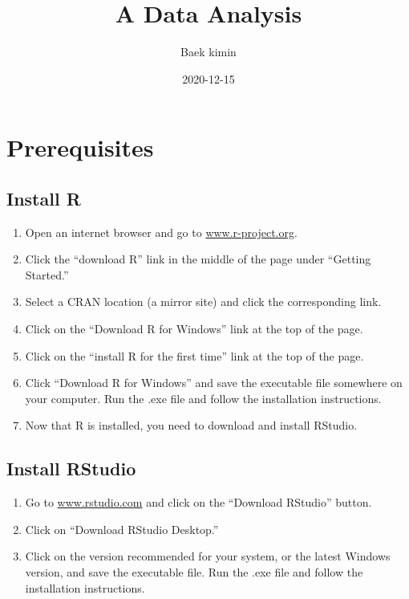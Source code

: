 \documentclass[
]{book}
\title{A Data Analysis}
\author{Baek kimin}
\date{2020-12-15}
\providecommand{\tightlist}{%
  \setlength{\itemsep}{0pt}\setlength{\parskip}{0pt}}
\begin{document}
\maketitle

{
\setcounter{tocdepth}{1}
\tableofcontents
}
\hypertarget{prerequisites}{%
\chapter*{Prerequisites}\label{prerequisites}}

\hypertarget{install-r}{%
\section*{Install R}\label{install-r}}

\begin{enumerate}
\def\labelenumi{\arabic{enumi}.}
\tightlist
\item
  Open an internet browser and go to \href{https://www.r-project.org}{www.r-project.org}.
\item
  Click the ``download R'' link in the middle of the page under ``Getting Started.''
\item
  Select a CRAN location (a mirror site) and click the corresponding link.\\
\item
  Click on the ``Download R for Windows'' link at the top of the page.\\
\item
  Click on the ``install R for the first time'' link at the top of the page.
\item
  Click ``Download R for Windows'' and save the executable file somewhere on your computer. Run the .exe file and follow the installation instructions.\\
\item
  Now that R is installed, you need to download and install RStudio.
\end{enumerate}

\hypertarget{install-rstudio}{%
\section*{Install RStudio}\label{install-rstudio}}

\begin{enumerate}
\def\labelenumi{\arabic{enumi}.}
\tightlist
\item
  Go to \href{https://www.rstudio.com}{www.rstudio.com} and click on the ``Download RStudio'' button.
\item
  Click on ``Download RStudio Desktop.''
\item
  Click on the version recommended for your system, or the latest Windows version, and save the executable file. Run the .exe file and follow the installation instructions.
\end{enumerate}
\end{document}
